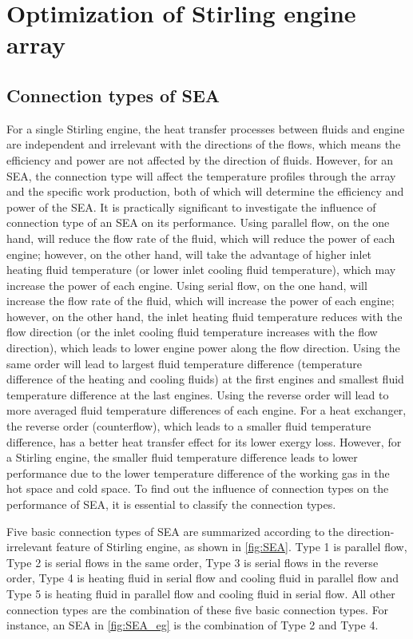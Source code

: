 \chapter{Optimization of Stirling engine array}
\label{cha:seao}

\section{Connection types of SEA}
\label{sec:connectionTypes}
For a single Stirling engine, the heat transfer processes between fluids and engine are independent and irrelevant with the directions of the flows, which means the efficiency and power are not affected by the direction of fluids. However, for an SEA, the connection type will affect the temperature profiles through the array and the specific work production, both of which will determine the efficiency and power of the SEA. It is practically significant to investigate the influence of connection type of an SEA on its performance. Using parallel flow, on the one hand, will reduce the flow rate of the fluid, which will reduce the power of each engine; however, on the other hand, will take the advantage of higher inlet heating fluid temperature (or lower inlet cooling fluid temperature), which may increase the power of each engine. Using serial flow, on the one hand, will increase the flow rate of the fluid, which will increase the power of each engine; however, on the other hand, the inlet heating fluid temperature reduces with the flow direction (or the inlet cooling fluid temperature increases with the flow direction), which leads to lower engine power along the flow direction. Using the same order will lead to largest fluid temperature difference (temperature difference of the heating and cooling fluids) at the first engines and smallest fluid temperature difference at the last engines. Using the reverse order will lead to more averaged fluid temperature differences of each engine. For a heat exchanger, the reverse order (counterflow), which leads to a smaller fluid temperature difference, has a better heat transfer effect for its lower exergy loss. However, for a Stirling engine, the smaller fluid temperature difference leads to lower performance due to the lower temperature difference of the working gas in the hot space and cold space. To find out the influence of connection types on the performance of SEA, it is essential to classify the connection types.

Five basic connection types of SEA are summarized according to the direction-irrelevant feature of Stirling engine, as shown in \autoref{fig:SEA}. Type 1 is parallel flow, Type 2 is serial flows in the same order, Type 3 is serial flows in the reverse order, Type 4 is heating fluid in serial flow and cooling fluid in parallel flow and Type 5 is heating fluid in parallel flow and cooling fluid in serial flow. All other connection types are the combination of these five basic connection types. For instance, an SEA in \autoref{fig:SEA_eg} is the combination of Type 2 and Type 4. 

